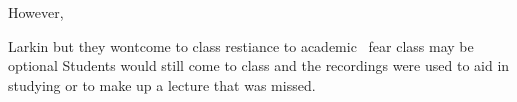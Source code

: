 \documentclass[sigconf]{acmart}
\begin{document}
However, 



Larkin but they wontcome to class restiance to academic \
fear class may be optional
Students would still come to class and the recordings were used to aid in studying or to make up a lecture that was missed.






\end{document}
